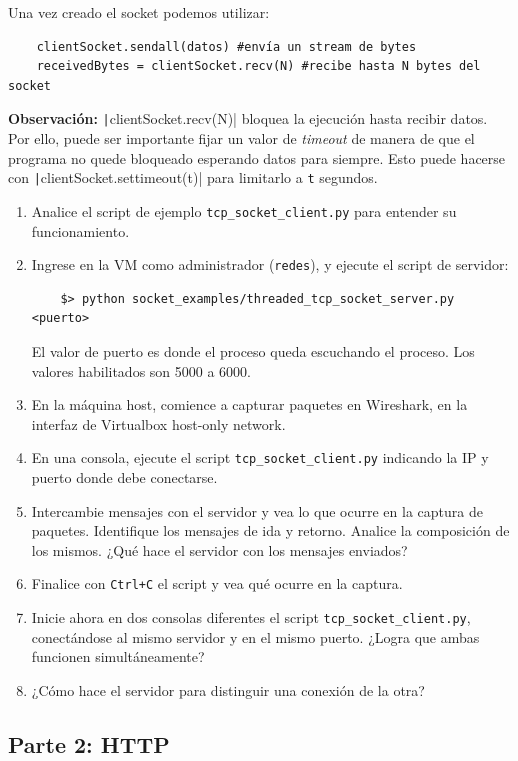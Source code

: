 \documentclass[a4paper,10pt]{article}
\begin{document}
Una vez creado el socket podemos utilizar:
\begin{verbatim}
    clientSocket.sendall(datos) #envía un stream de bytes
    receivedBytes = clientSocket.recv(N) #recibe hasta N bytes del socket
\end{verbatim}

\textbf{Observación:} \texttt|clientSocket.recv(N)| bloquea la ejecución hasta recibir datos. Por ello, puede ser importante fijar un valor de \emph{timeout} de manera de que el programa no quede bloqueado esperando datos para siempre. Esto puede hacerse con \texttt|clientSocket.settimeout(t)| para limitarlo a \texttt{t} segundos.


\begin{enumerate}
    \item Analice el script de ejemplo \texttt{tcp\_socket\_client.py} para entender su funcionamiento.
    \item Ingrese en la VM como administrador (\texttt{redes}), y ejecute el script de servidor:
    \begin{verbatim}
    $> python socket_examples/threaded_tcp_socket_server.py <puerto>
    \end{verbatim}
    El valor de puerto es donde el proceso queda escuchando el proceso. Los valores habilitados son 5000 a 6000.
    \item En la máquina host, comience a capturar paquetes en Wireshark, en la interfaz de Virtualbox host-only network.
    \item En una consola, ejecute el script \texttt{tcp\_socket\_client.py} indicando la IP y puerto donde debe conectarse.
    \item Intercambie mensajes con el servidor y vea lo que ocurre en la captura de paquetes. Identifique los mensajes de ida y retorno. Analice la composición de los mismos. ¿Qué hace el servidor con los mensajes enviados?
    \item Finalice con \texttt{Ctrl+C} el script y vea qué ocurre en la captura.
    \item Inicie ahora en dos consolas diferentes el script \texttt{tcp\_socket\_client.py}, conectándose al mismo servidor y en el mismo puerto. ¿Logra que ambas funcionen simultáneamente?
    \item ¿Cómo hace el servidor para distinguir una conexión de la otra?
    
\end{enumerate}

\subsection*{Parte 2: HTTP}
\end{document}
